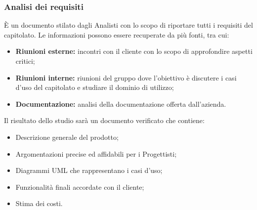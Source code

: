 \subsubsection{Analisi dei requisiti}\label{ProcessiPrimari_Sviluppo_AnalisiRequisiti}
È un documento stilato dagli Analisti con lo scopo di riportare tutti i requisiti del capitolato. Le informazioni possono essere recuperate da più fonti, tra cui: 
\begin{itemize}
	\item \textbf{Riunioni esterne:} incontri con il cliente con lo scopo di approfondire aspetti critici;
	\item \textbf{Riunioni interne:} riunioni del gruppo dove l'obiettivo è discutere i casi d'uso del capitolato e studiare il dominio di utilizzo;
	\item \textbf{Documentazione:} analisi della documentazione offerta dall'azienda.
\end{itemize}
Il risultato dello studio sarà un documento verificato che contiene:
\begin{itemize}
	\item Descrizione generale del prodotto;
	\item Argomentazioni precise ed affidabili per i Progettisti;
	\item Diagrammi UML che rappresentano i casi d'uso;
	\item Funzionalità finali accordate con il cliente;
	\item Stima dei costi.      
\end{itemize}

